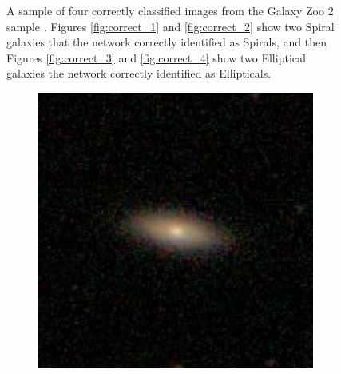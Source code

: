 \documentclass[12pt, onecolumn]{aa}
\begin{document}
\begin{figure}[h]
    \caption{A sample of four correctly classified images from the Galaxy Zoo 2 sample \citep{Willett2013}. Figures \ref{fig:correct_1} and \ref{fig:correct_2} show two Spiral galaxies that the network correctly identified as Spirals, and then Figures \ref{fig:correct_3} and \ref{fig:correct_4} show two Elliptical galaxies the network correctly identified as Ellipticals. }
    \label{fig:correctly_classified}
\end{figure}
\begin{figure}[h]
\centering
    \begin{subfigure}[t]{0.23\linewidth}
    \centering
    \includegraphics[width=\linewidth]{Figures/Wrongly_Classified/Lenticular/14538.jpg}
    \caption{}
    \label{fig:incorrect_1}
    \end{subfigure}
    \begin{subfigure}[t]{0.23\linewidth}
    \centering

\end{subfigure}
\end{figure}
\end{document}
